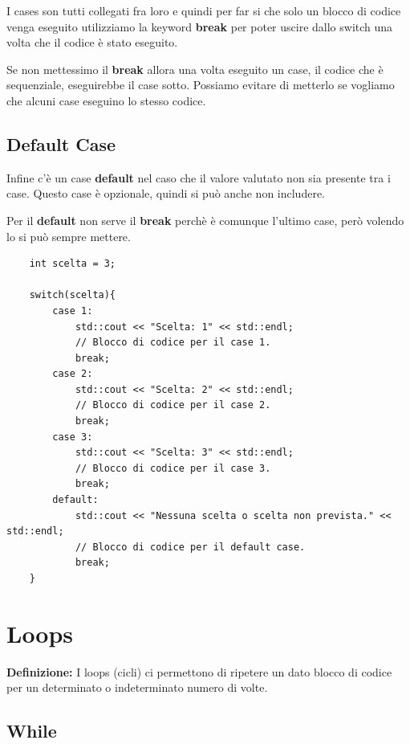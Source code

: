 \textsf{\small I cases son tutti collegati fra loro e quindi per far si che solo un blocco di codice venga eseguito utilizziamo la keyword \textbf{break} per poter uscire dallo switch una volta che il codice è stato eseguito.} 

\textsf{\small Se non mettessimo il \textbf{break} allora una volta eseguito un case, il codice che è sequenziale, eseguirebbe il case sotto. Possiamo evitare di metterlo se vogliamo che alcuni case eseguino lo stesso codice.} \\

\subsection{Default Case}

\textsf{\small Infine c'è un case \textbf{default} nel caso che il valore valutato non sia presente tra i case. Questo case è opzionale, quindi si può anche non includere.}

\textsf{\small Per il \textbf{default} non serve il \textbf{break} perchè è comunque l'ultimo case, però volendo lo si può sempre mettere.} \\

\begin{lstlisting}
	int scelta = 3;
	
	switch(scelta){
		case 1:
			std::cout << "Scelta: 1" << std::endl;
			// Blocco di codice per il case 1.
			break;
		case 2:
			std::cout << "Scelta: 2" << std::endl;
			// Blocco di codice per il case 2.
			break;
		case 3:
			std::cout << "Scelta: 3" << std::endl;
			// Blocco di codice per il case 3.
			break;
		default:
			std::cout << "Nessuna scelta o scelta non prevista." << std::endl;
			// Blocco di codice per il default case.
			break;
	}
\end{lstlisting}


\newpage

\section{Loops}

\textsf{\small \textbf{Definizione: } I loops (cicli) ci permettono di ripetere un dato blocco di codice per un determinato o indeterminato numero di volte.} \\

\subsection{While}

